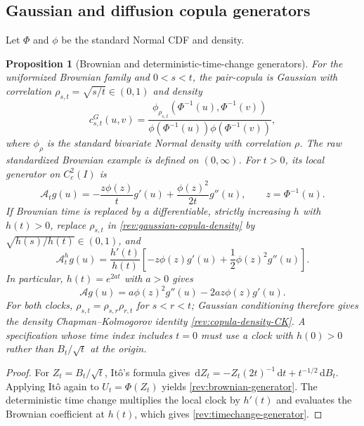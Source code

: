\documentclass[11pt]{article}
\newtheorem{proposition}[definition]{Proposition}
\theoremstyle{remark}
\newcommand{\dd}{\,\mathrm d}
\begin{document}
\subsection{Gaussian and diffusion copula generators}

Let $\Phi$ and $\phi$ be the standard Normal CDF and density.

\begin{proposition}[Brownian and deterministic-time-change generators]
\label{rev:prop-gaussian-generator}
For the uniformized Brownian family and $0<s<t$, the pair-copula is Gaussian
with correlation $\rho_{s,t}=\sqrt{s/t}\in(0,1)$ and density
\begin{equation}
c^{G}_{s,t}(u,v)=
\frac{\phi_{\rho_{s,t}}\!\left(\Phi^{-1}(u),\Phi^{-1}(v)\right)}
     {\phi\!\left(\Phi^{-1}(u)\right)\phi\!\left(\Phi^{-1}(v)\right)},
\label{rev:gaussian-copula-density}
\end{equation}
where $\phi_\rho$ is the standard bivariate Normal density with correlation
$\rho$.  The raw standardized Brownian example is defined on $(0,\infty)$.
For $t>0$, its local generator on $C_c^2(I)$ is
\begin{equation}
\mathcal A_tg(u)=
-\frac{z\phi(z)}{t}g'(u)+\frac{\phi(z)^2}{2t}g''(u),
\qquad z=\Phi^{-1}(u).
\label{rev:brownian-generator}
\end{equation}
If Brownian time is replaced by a differentiable, strictly increasing $h$ with
$h(t)>0$, replace $\rho_{s,t}$ in \eqref{rev:gaussian-copula-density} by
$\sqrt{h(s)/h(t)}\in(0,1)$, and
\begin{equation}
\mathcal A_t^hg(u)=\frac{h'(t)}{h(t)}
\left[-z\phi(z)g'(u)+\frac12\phi(z)^2g''(u)\right].
\label{rev:timechange-generator}
\end{equation}
In particular, $h(t)=e^{2at}$ with $a>0$ gives
\begin{equation}
\mathcal A g(u)=a\phi(z)^2g''(u)-2az\phi(z)g'(u).
\label{rev:stationary-gaussian-generator}
\end{equation}
For both clocks,
$\rho_{s,t}=\rho_{s,r}\rho_{r,t}$ for $s<r<t$; Gaussian conditioning therefore
gives the density Chapman--Kolmogorov identity
\eqref{rev:copula-density-CK}.  A specification whose time index includes
$t=0$ must use a clock with $h(0)>0$ rather than $B_t/\sqrt t$ at the origin.
\end{proposition}

\begin{proof}
For $Z_t=B_t/\sqrt t$, It\^o's formula gives
$\dd Z_t=-Z_t(2t)^{-1}\dd t+t^{-1/2}\dd B_t$.  Applying It\^o again to
$U_t=\Phi(Z_t)$ yields \eqref{rev:brownian-generator}.  The deterministic
time change multiplies the local clock by $h'(t)$ and evaluates the Brownian
coefficient at $h(t)$, which gives \eqref{rev:timechange-generator}.
\end{proof}
\end{document}
